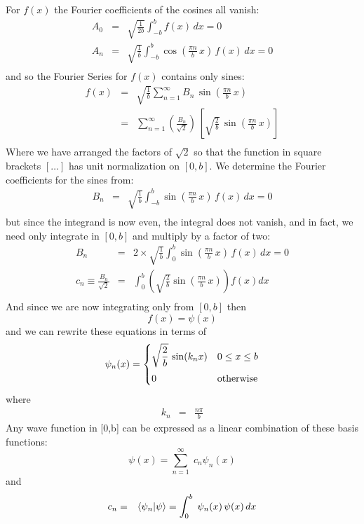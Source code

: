 \documentclass[12pt]{book}
\begin{document}
For $f(x)$ the Fourier coefficients of the cosines all vanish:
\begin{eqnarray*}
A_0 &=& \sqrt{\frac{1}{2b}} \int_{-b}^{b} f(x) \, dx = 0\\
A_n &=& \sqrt{\frac{1}{b}} \int_{-b}^{b} 
\cos\left(\frac{\pi n}{b} \, x \right) \, f(x) \, dx = 0\\
\end{eqnarray*}
and so the Fourier Series for $f(x)$ contains only sines:
\begin{eqnarray*}
f(x) &=& \sqrt{\frac{1}{b}} \sum_{n=1}^{\infty}  B_n \, \sin\left(\frac{\pi n}{b} \, x \right) \\
&=&  \sum_{n=1}^{\infty}  \left( \frac{B_n}{\sqrt{2}}\right) \, \left[ \sqrt{\frac{2}{b}} \, \sin\left(\frac{\pi n}{b} \, x \right) \right]\\
\end{eqnarray*}
Where we have arranged the factors of $\sqrt{2}$ so that the function in square brackets $[\ldots]$ has unit normalization on $[0,b]$.  We determine the Fourier coefficients for the sines from:
\begin{eqnarray*}
B_n &=& \sqrt{\frac{1}{b}} \int_{-b}^{b} 
\sin\left(\frac{\pi n}{b} \, x \right) \, f(x) \, dx = 0\\
\end{eqnarray*}
but since the integrand is now even, the integral does not vanish, and in fact, we need only integrate in $[0,b]$ and multiply by a factor of two:
\begin{eqnarray*}
B_n &=& 2 \times \sqrt{\frac{1}{b}} \int_{0}^{b} 
\sin\left(\frac{\pi n}{b} \, x \right) \, f(x) \, dx = 0\\[14pt]
c_n \equiv \frac{B_n}{\sqrt{2}} &=& \int_{0}^{b} 
\left( \sqrt{\frac{2}{b}} \sin\left(\frac{\pi n}{b} \, x \right) \right) f(x) dx \\
\end{eqnarray*}
And since we are now integrating only from $[0,b]$ then 
$$f(x) = \psi(x)$$ 
and we can rewrite these equations in terms of 
\begin{equation}
\psi_n(x) = 
\begin{cases}
{\displaystyle \sqrt{\frac{2}{b}} \, \sin(k_n x)} & 0 \leq x \leq b\\[8pt]
0 & \rm otherwise \\
\end{cases}
\end{equation}
where
\begin{eqnarray*}
k_n&=&\frac{n\pi}{b}
\end{eqnarray*}
Any wave function in [0,b] can be expressed as a linear combination of these basis functions:
\begin{equation}
\psi(x) = \sum_{n=1}^{\infty} \; c_n \psi_n(x)
\end{equation}
and
\begin{eqnarray*}
c_n &=& \braket{\psi_n| \psi} = \int_{0}^{b} \; \psi_n(x) \, \psi(x) \, dx \\
\end{eqnarray*}
\end{document}
